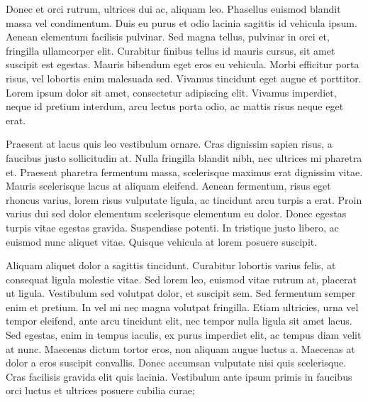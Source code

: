 \documentclass{book}
\begin{document}
            Donec et orci rutrum, ultrices dui ac, aliquam leo. Phasellus euismod blandit massa
               vel condimentum. Duis eu purus et odio lacinia sagittis id vehicula ipsum. Aenean
               elementum facilisis pulvinar. Sed magna tellus, pulvinar in orci et, fringilla
               ullamcorper elit. Curabitur finibus tellus id mauris cursus, sit amet suscipit est
               egestas. Mauris bibendum eget eros eu vehicula. Morbi efficitur porta risus, vel
               lobortis enim malesuada sed. Vivamus tincidunt eget augue et porttitor. Lorem ipsum
               dolor sit amet, consectetur adipiscing elit. Vivamus imperdiet, neque id pretium
               interdum, arcu lectus porta odio, ac mattis risus neque eget erat.

            Praesent at lacus quis leo vestibulum ornare. Cras dignissim sapien risus, a faucibus
               justo sollicitudin at. Nulla fringilla blandit nibh, nec ultrices mi pharetra et.
               Praesent pharetra fermentum massa, scelerisque maximus erat dignissim vitae. Mauris
               scelerisque lacus at aliquam eleifend. Aenean fermentum, risus eget rhoncus varius,
               lorem risus vulputate ligula, ac tincidunt arcu turpis a erat. Proin varius dui sed
               dolor elementum scelerisque elementum eu dolor. Donec egestas turpis vitae egestas
               gravida. Suspendisse potenti. In tristique justo libero, ac euismod nunc aliquet
               vitae. Quisque vehicula at lorem posuere suscipit.

            Aliquam aliquet dolor a sagittis tincidunt. Curabitur lobortis varius felis, at
               consequat ligula molestie vitae. Sed lorem leo, euismod vitae rutrum at, placerat ut
               ligula. Vestibulum sed volutpat dolor, et suscipit sem. Sed fermentum semper enim et
               pretium. In vel mi nec magna volutpat fringilla. Etiam ultricies, urna vel tempor
               eleifend, ante arcu tincidunt elit, nec tempor nulla ligula sit amet lacus. Sed
               egestas, enim in tempus iaculis, ex purus imperdiet elit, ac tempus diam velit at
               nunc. Maecenas dictum tortor eros, non aliquam augue luctus a. Maecenas at dolor a
               eros suscipit convallis. Donec accumsan vulputate nisi quis scelerisque. Cras
               facilisis gravida elit quis lacinia. Vestibulum ante ipsum primis in faucibus orci
               luctus et ultrices posuere cubilia curae;
\end{document}
